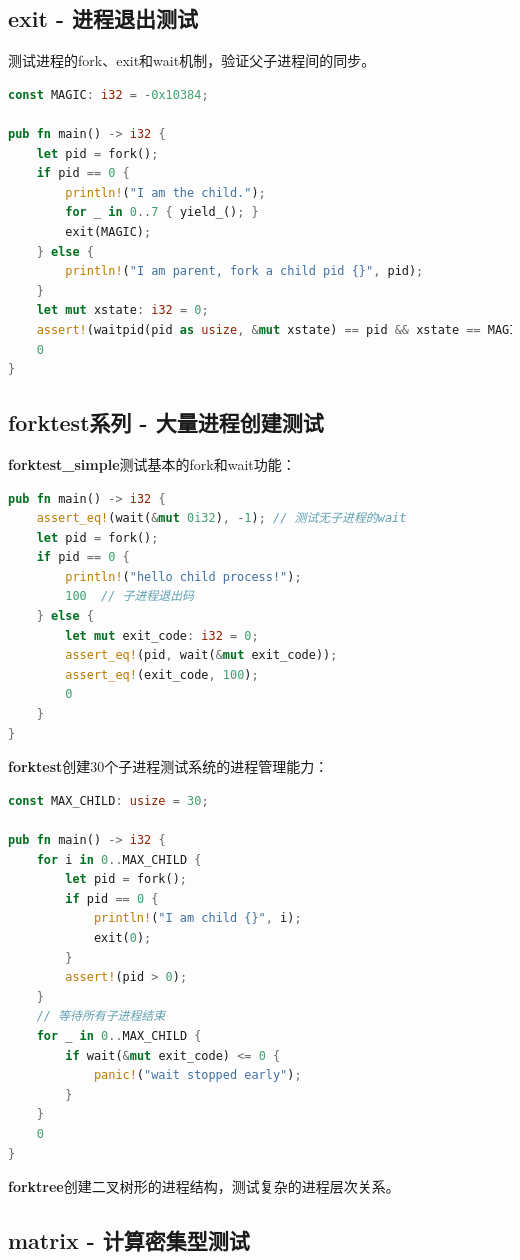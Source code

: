 \subsection{exit - 进程退出测试}

测试进程的fork、exit和wait机制，验证父子进程间的同步。

\begin{lstlisting}[language=Rust]
const MAGIC: i32 = -0x10384;

pub fn main() -> i32 {
    let pid = fork();
    if pid == 0 {
        println!("I am the child.");
        for _ in 0..7 { yield_(); }
        exit(MAGIC);
    } else {
        println!("I am parent, fork a child pid {}", pid);
    }
    let mut xstate: i32 = 0;
    assert!(waitpid(pid as usize, &mut xstate) == pid && xstate == MAGIC);
    0
}
\end{lstlisting}

\subsection{forktest系列 - 大量进程创建测试}

\textbf{forktest\_simple}测试基本的fork和wait功能：

\begin{lstlisting}[language=Rust]
pub fn main() -> i32 {
    assert_eq!(wait(&mut 0i32), -1); // 测试无子进程的wait
    let pid = fork();
    if pid == 0 {
        println!("hello child process!");
        100  // 子进程退出码
    } else {
        let mut exit_code: i32 = 0;
        assert_eq!(pid, wait(&mut exit_code));
        assert_eq!(exit_code, 100);
        0
    }
}
\end{lstlisting}

\textbf{forktest}创建30个子进程测试系统的进程管理能力：

\begin{lstlisting}[language=Rust]
const MAX_CHILD: usize = 30;

pub fn main() -> i32 {
    for i in 0..MAX_CHILD {
        let pid = fork();
        if pid == 0 {
            println!("I am child {}", i);
            exit(0);
        }
        assert!(pid > 0);
    }
    // 等待所有子进程结束
    for _ in 0..MAX_CHILD {
        if wait(&mut exit_code) <= 0 {
            panic!("wait stopped early");
        }
    }
    0
}
\end{lstlisting}

\textbf{forktree}创建二叉树形的进程结构，测试复杂的进程层次关系。

\subsection{matrix - 计算密集型测试}


